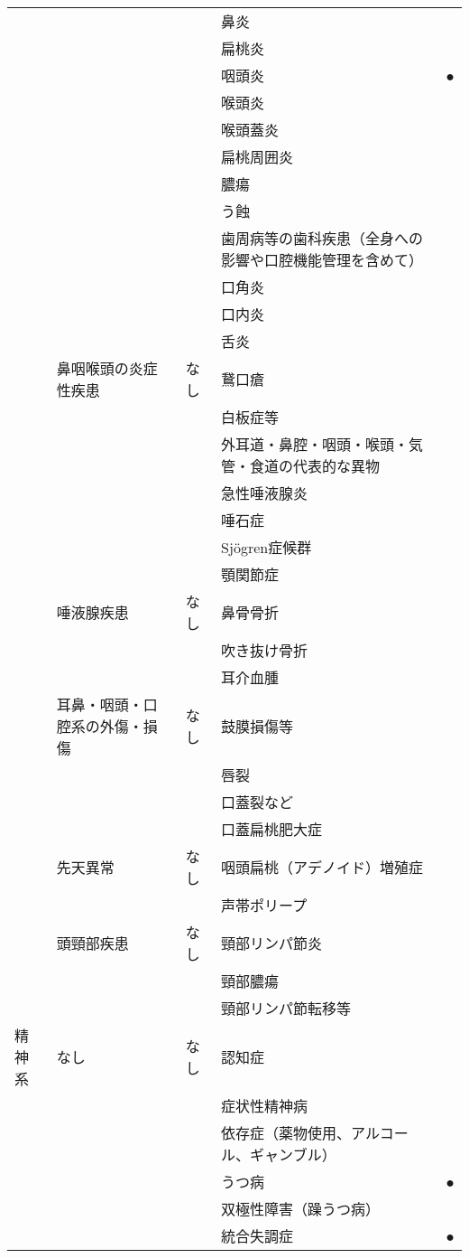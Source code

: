 \begin{xltabular}{\linewidth}{XXXXX}
 &  &  & 鼻炎 &  \\
 &  &  & 扁桃炎 &  \\
 &  &  & 咽頭炎 & ● \\
 &  &  & 喉頭炎 &  \\
 &  &  & 喉頭蓋炎 &  \\
 &  &  & 扁桃周囲炎 &  \\
 &  &  & 膿瘍 &  \\
 &  &  & う蝕 &  \\
 &  &  & 歯周病等の歯科疾患（全身への影響や口腔機能管理を含めて） &  \\
 &  &  & 口角炎 &  \\
 &  &  & 口内炎 &  \\
 &  &  & 舌炎 &  \\
 & 鼻咽喉頭の炎症性疾患 & なし & 鵞口瘡 &  \\
 &  &  & 白板症等 &  \\
 &  &  & 外耳道・鼻腔・咽頭・喉頭・気管・食道の代表的な異物 &  \\
 &  &  & 急性唾液腺炎 &  \\
 &  &  & 唾石症 &  \\
 &  &  & Sjögren症候群 &  \\
 &  &  & 顎関節症 &  \\
 & 唾液腺疾患 & なし & 鼻骨骨折 &  \\
 &  &  & 吹き抜け骨折 &  \\
 &  &  & 耳介血腫 &  \\
 & 耳鼻・咽頭・口腔系の外傷・損傷 & なし & 鼓膜損傷等 &  \\
 &  &  & 唇裂 &  \\
 &  &  & 口蓋裂など &  \\
 &  &  & 口蓋扁桃肥大症 &  \\
 & 先天異常 & なし & 咽頭扁桃（アデノイド）増殖症 &  \\
 &  &  & 声帯ポリープ &  \\
 & 頭頸部疾患 & なし & 頸部リンパ節炎 &  \\
 &  &  & 頸部膿瘍 &  \\
 &  &  & 頸部リンパ節転移等 &  \\
精神系 & なし & なし & 認知症 &  \\
 &  &  & 症状性精神病 &  \\
 &  &  & 依存症（薬物使用、アルコール、ギャンブル） &  \\
 &  &  & うつ病 & ● \\
 &  &  & 双極性障害（躁うつ病） &  \\
 &  &  & 統合失調症 & ● \\

\end{xltabular}
